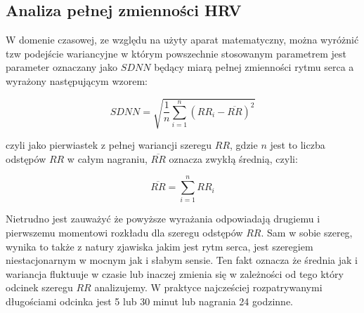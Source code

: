 \subsection{Analiza pełnej zmienności HRV}

W domenie czasowej, ze względu na użyty aparat matematyczny, można wyróżnić tzw podejście
wariancyjne w którym powszechnie stosowanym parametrem jest parameter oznaczany jako
$SDNN$ będący miarą pełnej zmienności rytmu serca a wyrażony następującym wzorem:  

\begin{equation}\label{eq6}
SDNN = \sqrt{\frac{1}{n}\sum_{i=1}^{n}(RR_{i} - \overline{RR})^{2}}
\end{equation}

czyli jako pierwiastek z pełnej wariancji szeregu $RR$, gdzie $n$ jest to liczba odstępów $RR$
w całym nagraniu, $\overline{RR}$ oznacza zwykłą średnią, czyli:

\begin{equation}
\overline{RR} = \sum_{i=1}^{n}RR_{i}
\end{equation}

Nietrudno jest zauważyć że powyższe wyrażania odpowiadają drugiemu i pierwszemu momentowi
rozkładu dla szeregu odstępów $RR$. Sam w sobie szereg, wynika to także z natury
zjawiska jakim jest rytm serca, jest szeregiem niestacjonarnym w mocnym jak i słabym
sensie. Ten fakt oznacza że średnia jak i wariancja fluktuuje w czasie lub inaczej zmienia
się w zależności od tego który odcinek szeregu $RR$ analizujemy. W praktyce najcześciej
rozpatrywanymi długościami odcinka jest 5 lub 30 minut lub nagrania 24 godzinne.
